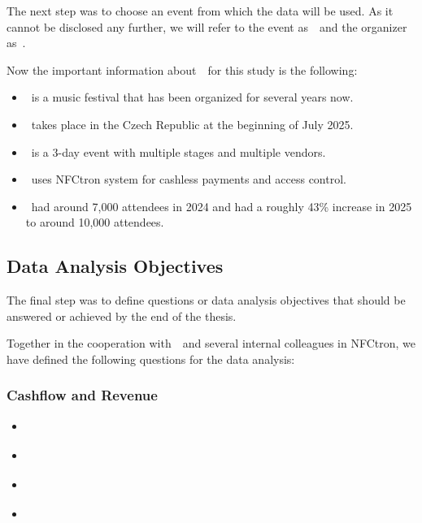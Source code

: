 The next step was to choose an event from which the data will be used.
As it cannot be disclosed any further, we will refer to the event as~\theEvent~and the organizer as~\theOrganizer.

Now the important information about~\theEvent~for this study is the following:
\begin{itemize}
	\item \theEvent~is a music festival that has been organized for several years now.
	\item \theEvent~takes place in the Czech Republic at the beginning of July 2025.
	\item \theEvent~is a 3-day event with multiple stages and multiple vendors.
	\item \theEvent~uses NFCtron system for cashless payments and access control.
	\item \theEvent~had around 7,000 attendees in 2024 and had a roughly 43\% increase in 2025 to around 10,000 attendees.
\end{itemize}

\subsection*{Data Analysis Objectives}
\label{subsec:introduction-objectives-data-analysis}

The final step was to define questions or data analysis objectives that should be answered or achieved by the end of the thesis.

Together in the cooperation with~\theOrganizer~and several internal colleagues in NFCtron, we have defined the following questions for the data analysis:

\subsubsection*{Cashflow and Revenue}
\begin{itemize}
	\item \textit{}
	\item \textit{}
	\item \textit{}
	\item \textit{}
\end{itemize}

